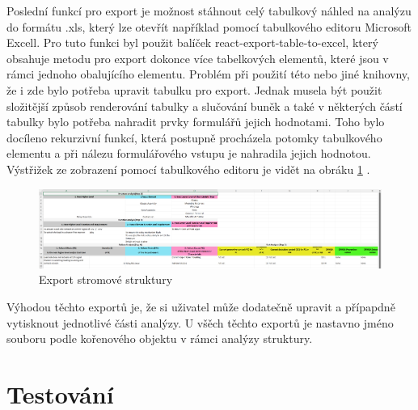 Poslední funkcí pro export je možnost stáhnout celý tabulkový náhled na analýzu do formátu .xls, který lze otevřít například pomocí tabulkového editoru Microsoft Excell. Pro tuto funkci byl použit balíček react-export-table-to-excel\cite{exportTable}, který obsahuje metodu pro export dokonce více tabelkových elementů, které jsou v rámci jednoho obalujícího elementu. Problém při použití této nebo jiné knihovny, že i zde bylo potřeba upravit tabulku pro export. Jednak musela být použit složitější způsob renderování tabulky a slučování buněk a také v některých částí tabulky bylo potřeba nahradit prvky formulářů jejich hodnotami. Toho bylo docíleno rekurzivní funkcí, která postupně procházela potomky tabulkového elementu a při nálezu formulářového vstupu je nahradila jejich hodnotou. Výstřižek ze zobrazení pomocí tabulkového editoru je vidět na obráku  \ref{fig:excel} . 

\begin{figure}[h]
\centering
	\includegraphics[width=1.0\textwidth]{Figures/excel.png}
	\caption{Export stromové struktury}
	\label{fig:excel}
\end{figure}

Výhodou těchto exportů je, že si uživatel může dodatečně upravit a přípapdně vytisknout jednotlivé části analýzy. U všěch těchto exportů je nastavno jméno souboru podle kořenového objektu v rámci analýzy struktury. 

\section{Testování}


